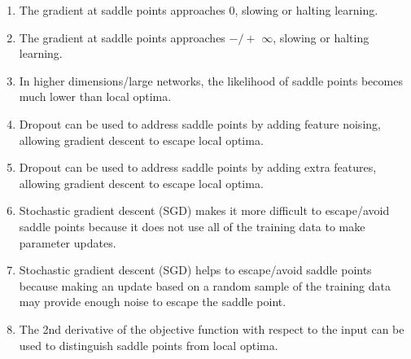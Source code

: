 \documentclass[12pt, letterpaper]{article}
\begin{document}
\begin{enumerate}[label=\alph*.]
        \begin{enumerate}
            \item The gradient at saddle points approaches 0, slowing or halting learning.
            \item The gradient at saddle points approaches $ -/+$ $\infty$, slowing or halting learning.
            \item In higher dimensions/large networks, the likelihood of saddle points becomes much lower than local optima.
            \item Dropout can be used to address saddle points by adding feature noising, allowing gradient descent to escape local optima.
            \item Dropout can be used to address saddle points by adding extra features, allowing gradient descent to escape local optima.
            \item Stochastic gradient descent (SGD) makes it more difficult to escape/avoid saddle points because it does not use all of the training data to make parameter updates.
            \item Stochastic gradient descent (SGD) helps to escape/avoid saddle points because making an update based on a random sample of the training data may provide enough noise to escape the saddle point.
            \item The 2nd derivative of the objective function with respect to the input can be used to distinguish saddle points from local optima.
        \end{enumerate}
        
    \end{enumerate}
\end{document}

